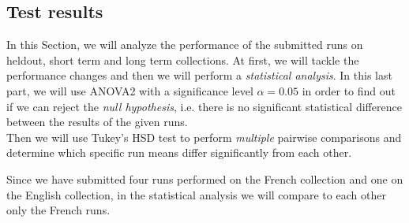 \subsection{Test results}
\label{subsec:test-res}

In this Section, we will analyze the performance of the submitted runs on heldout, short term and long term collections. At first, we will tackle the performance changes and then we will perform a \emph{statistical analysis}. In this last part, we will use ANOVA2 with a significance level $\alpha=0.05$ in order to find out if we can reject the \emph{null hypothesis}, i.e. there is no significant statistical difference between the results of the given runs. \\Then we will use Tukey's \ac{HSD} test to perform \emph{multiple} pairwise comparisons and determine which specific run means differ significantly from each other.

Since we have submitted four runs performed on the French collection and one on the English collection, in the statistical analysis we will compare to each other only the French runs.





